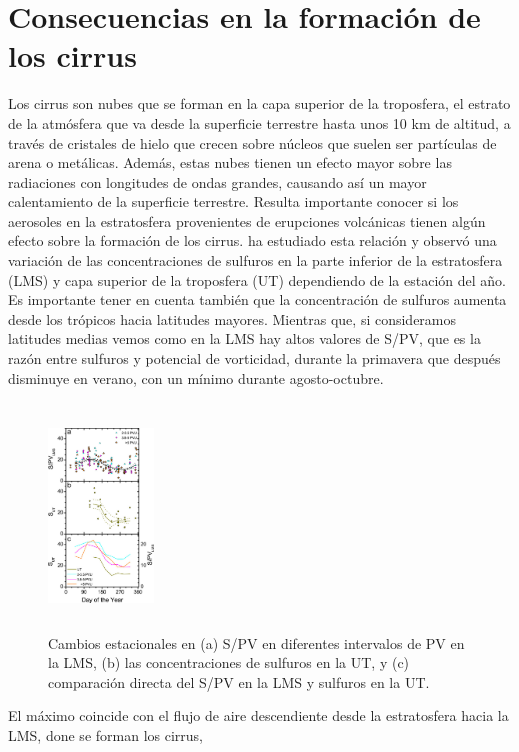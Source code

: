 \documentclass[a4apaper,twocolumn,10pt]{article}
\begin{document}
\section{Consecuencias en la formación de los cirrus}
Los cirrus son nubes que se forman en la capa superior de la troposfera, el estrato de la
atm\'osfera que va desde la superficie terrestre hasta unos 10 km de altitud, a trav\'es de cristales de hielo que crecen sobre n\'ucleos que suelen ser part\'iculas de arena o met\'alicas. Adem\'as, estas nubes tienen un efecto mayor sobre las radiaciones con longitudes de ondas grandes, causando
as\'i un mayor calentamiento de la superficie terrestre. Resulta importante conocer si los
aerosoles en la estratosfera provenientes de erupciones volc\'anicas tienen alg\'un efecto sobre la formaci\'on de los cirrus. \cite{friberg2015influence} ha estudiado esta relaci\'on y observ\'o una variaci\'on de las concentraciones de sulfuros en la parte inferior de la estratosfera (LMS) y capa
superior de la troposfera (UT) dependiendo de la estaci\'on del a\~no. Es importante tener en cuenta tambi\'en que la concentraci\'on de sulfuros aumenta desde los tr\'opicos hacia latitudes mayores. Mientras que, si consideramos latitudes medias vemos como en la LMS hay altos valores de S/PV, que es la raz\'on entre sulfuros y potencial de vorticidad, durante la primavera que despu\'es disminuye en verano, con un m\'inimo durante agosto-octubre. 
\begin{figure}[t]
\centering
  \includegraphics[width=0.25\textwidth,height=6cm]{Figura1}
  \caption{Cambios estacionales en (a) S/PV en diferentes intervalos de PV en la LMS, (b) las concentraciones de sulfuros en la UT, y (c) comparación directa del S/PV en la LMS y sulfuros en la UT.}
  \label{fig:Figura1}
\end{figure}
El m\'aximo coincide con el flujo de aire descendiente desde la estratosfera hacia la LMS, done se forman los cirrus,
\end{document}
